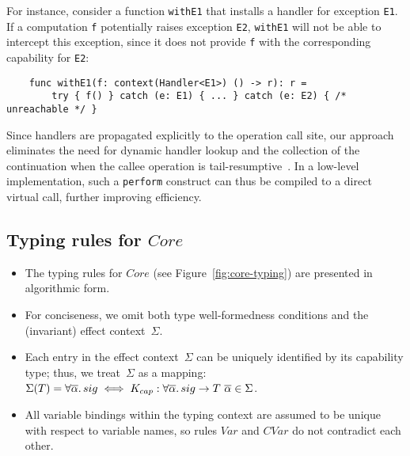 \documentclass[acmsmall,review,screen]{acmart}
\newcommand{\ap}{~}
\begin{document}
For instance, consider a function \texttt{withE1} that installs a handler for exception \texttt{E1}.
If a computation \texttt{f} potentially raises exception \texttt{E2}, \texttt{withE1} will not be able to intercept this exception, since it does not provide \texttt{f} with the corresponding capability for \texttt{E2}:
\begin{verbatim}
    func withE1(f: context(Handler<E1>) () -> r): r =
        try { f() } catch (e: E1) { ... } catch (e: E2) { /* unreachable */ }
\end{verbatim}

Since handlers are propagated explicitly to the operation call site, our approach eliminates the need for dynamic handler lookup and the collection of the continuation when the callee operation is tail-resumptive~\cite{xie2020effect}.
In a low-level implementation, such a \texttt{perform} construct can thus be compiled to a direct virtual call, further improving efficiency. %


\subsection{Typing rules for $Core$} \label{subsec:core-typing}

\begin{itemize}
    \item The typing rules for $Core$ (see Figure~\ref{fig:core-typing}) are presented in algorithmic form.
    \item For conciseness, we omit both type well-formedness conditions and the (invariant) effect context~$\Sigma$.
    \item Each entry in the effect context~$\Sigma$ can be uniquely identified by its capability type; thus, we treat~$\Sigma$ as a mapping: $\Sigma(T) = \forall\overline{\alpha}\ldotp sig \iff K_{cap} : \forall\overline{\alpha}\ldotp sig\to T\ap\overline{\alpha}\in\Sigma$.
    \item All variable bindings within the typing context are assumed to be unique with respect to variable names, so rules $Var$ and $CVar$ do not contradict each other.
\end{itemize}
\end{document}
